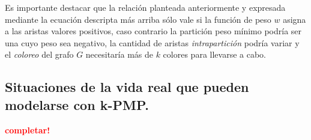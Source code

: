 Es importante destacar que la relación planteada anteriormente y expresada mediante 
la ecuación descripta más arriba sólo vale si la función de peso $w$ asigna a las 
aristas valores positivos, caso contrario la partición peso mínimo podría ser una 
cuyo peso sea negativo, la cantidad de aristas \textit{intrapartición} podría variar y el 
\textit{coloreo} del grafo $G$ necesitaría más de $k$ colores para llevarse a cabo.



\newpage
\subsection{Situaciones de la vida real que pueden modelarse con k-PMP.}
\vspace*{0.3cm}
\textcolor{red}{\textbf{completar!}}

